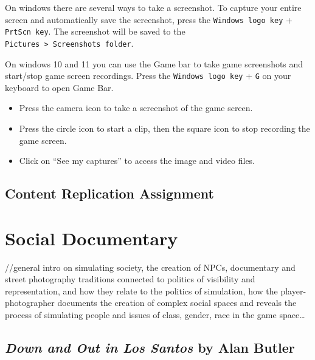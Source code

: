 \documentclass[
  openany]{book}
\begin{document}
On windows there are several ways to take a screenshot. To capture your entire screen and automatically save the screenshot, press the \texttt{Windows\ logo\ key} + \texttt{PrtScn\ key}. The screenshot will be saved to the \texttt{Pictures\ \textgreater{}\ Screenshots\ folder}.

On windows 10 and 11 you can use the Game bar to take game screenshots and start/stop game screen recordings. Press the \texttt{Windows\ logo\ key} + \texttt{G} on your keyboard to open Game Bar.

\begin{itemize}
\item
  Press the camera icon to take a screenshot of the game screen.
\item
  Press the circle icon to start a clip, then the square icon to stop recording the game screen.
\item
  Click on ``See my captures'' to access the image and video files.
\end{itemize}

\hypertarget{content-replication-assignment}{%
\section*{Content Replication Assignment}\label{content-replication-assignment}}

\hypertarget{social-documentary}{%
\chapter{Social Documentary}\label{social-documentary}}

//general intro on simulating society, the creation of NPCs, documentary and street photography traditions connected to politics of visibility and representation, and how they relate to the politics of simulation, how the player-photographer documents the creation of complex social spaces and reveals the process of simulating people and issues of class, gender, race in the game space\ldots{}

\hypertarget{down-and-out-in-los-santos-by-alan-butler}{%
\section*{\texorpdfstring{\emph{Down and Out in Los Santos} by Alan Butler}{Down and Out in Los Santos by Alan Butler}}\label{down-and-out-in-los-santos-by-alan-butler}}
\end{document}
